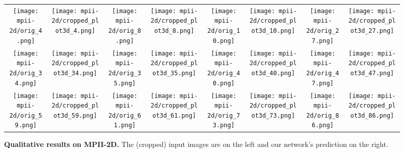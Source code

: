 \documentclass[preprint]{elsarticle}
\begin{document}
\begin{figure}
\centering
\begin{tabular}{cccccccc}
\texttt{[image: mpii-2d/orig\_4.png]} &
\texttt{[image: mpii-2d/cropped\_plot3d\_4.png]} &
\texttt{[image: mpii-2d/orig\_8.png]} &
\texttt{[image: mpii-2d/cropped\_plot3d\_8.png]} &
\texttt{[image: mpii-2d/orig\_10.png]} &
\texttt{[image: mpii-2d/cropped\_plot3d\_10.png]} &
\texttt{[image: mpii-2d/orig\_27.png]} &
\texttt{[image: mpii-2d/cropped\_plot3d\_27.png]} \\
\texttt{[image: mpii-2d/orig\_34.png]} &
\texttt{[image: mpii-2d/cropped\_plot3d\_34.png]} &
\texttt{[image: mpii-2d/orig\_35.png]} &
\texttt{[image: mpii-2d/cropped\_plot3d\_35.png]} &
\texttt{[image: mpii-2d/orig\_40.png]} &
\texttt{[image: mpii-2d/cropped\_plot3d\_40.png]} &
\texttt{[image: mpii-2d/orig\_47.png]} &
\texttt{[image: mpii-2d/cropped\_plot3d\_47.png]} \\
\texttt{[image: mpii-2d/orig\_59.png]} &
\texttt{[image: mpii-2d/cropped\_plot3d\_59.png]} &
\texttt{[image: mpii-2d/orig\_61.png]} &
\texttt{[image: mpii-2d/cropped\_plot3d\_61.png]} &
\texttt{[image: mpii-2d/orig\_73.png]} &
\texttt{[image: mpii-2d/cropped\_plot3d\_73.png]} &
\texttt{[image: mpii-2d/orig\_86.png]} &
\texttt{[image: mpii-2d/cropped\_plot3d\_86.png]} \\
\end{tabular}
\caption{\textbf{Qualitative results on MPII-2D.} The (cropped) input images are on the left and our network's prediction on the right.}
\label{fig:mpii-2d}
\end{figure}
\end{document}
